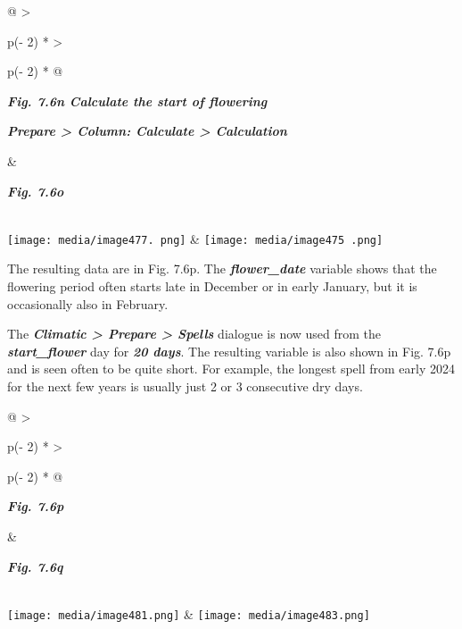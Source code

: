 \documentclass[
  letterpaper,
  DIV=11,
  numbers=noendperiod]{scrreprt}
\begin{document}
\begin{longtable}[]{@{}
  >{\raggedright\arraybackslash}p{(\columnwidth - 2\tabcolsep) * }
  >{\raggedright\arraybackslash}p{(\columnwidth - 2\tabcolsep) * }@{}}
\toprule\noalign{}
\begin{minipage}[b]{\linewidth}\raggedright
\textbf{\emph{Fig. 7.6n Calculate the start of flowering}}

\textbf{\emph{Prepare \textgreater{} Column: Calculate \textgreater{}
Calculation}}
\end{minipage} & \begin{minipage}[b]{\linewidth}\raggedright
\textbf{\emph{Fig. 7.6o}}
\end{minipage} \\
\midrule\noalign{}
\endhead
\bottomrule\noalign{}
\endlastfoot
\texttt{[image: media/image477. png]} &
\texttt{[image: media/image475 .png]} \\
\end{longtable}

The resulting data are in Fig. 7.6p. The \textbf{\emph{flower\_date}}
variable shows that the flowering period often starts late in December
or in early January, but it is occasionally also in February.

The \textbf{\emph{Climatic \textgreater{} Prepare \textgreater{}
Spells}} dialogue is now used from the \textbf{\emph{start\_flower}} day
for \textbf{\emph{20 days}}. The resulting variable is also shown in
Fig. 7.6p and is seen often to be quite short. For example, the longest
spell from early 2024 for the next few years is usually just 2 or 3
consecutive dry days.

\begin{longtable}[]{@{}
  >{\raggedright\arraybackslash}p{(\columnwidth - 2\tabcolsep) * }
  >{\raggedright\arraybackslash}p{(\columnwidth - 2\tabcolsep) * }@{}}
\toprule\noalign{}
\begin{minipage}[b]{\linewidth}\raggedright
\textbf{\emph{Fig. 7.6p}}
\end{minipage} & \begin{minipage}[b]{\linewidth}\raggedright
\textbf{\emph{Fig. 7.6q}}
\end{minipage} \\
\midrule\noalign{}
\endhead
\bottomrule\noalign{}
\endlastfoot
\texttt{[image: media/image481.png]} &
\texttt{[image: media/image483.png]} \\
\end{longtable}
\end{document}
